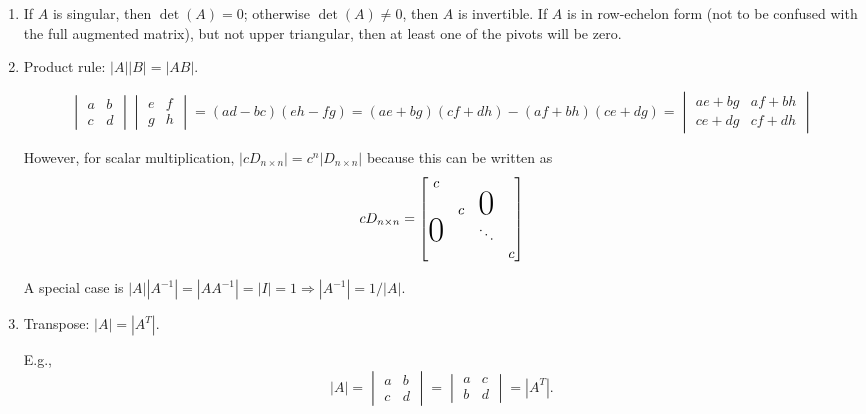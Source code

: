 \documentclass[reqno]{amsart}
\theoremstyle{definition}
\newenvironment{handwave}{%
  \renewcommand{\proofname}{Handwavey proof}\proof}{\endproof}
\begin{document}
\begin{enumerate}
\begin{handwave}
\end{handwave}

\item  If $A$ is singular, then $\det(A) = 0$; otherwise $\det(A) \neq 0$, then $A$ is invertible.
If $A$ is in row-echelon form (not to be confused with the full augmented matrix), but not upper triangular,
then at least one of the pivots will be zero.

\item  Product rule: $|A||B| = |AB|$.

\begin{equation*}
\begin{vmatrix}
a & b\\
c & d
\end{vmatrix}\begin{vmatrix}
e & f\\
g & h
\end{vmatrix} = (ad - bc)(eh - fg) = (ae+bg)(cf+dh) - ( af+bh)(ce+dg) = \begin{vmatrix}
ae+bg & af+bh\\
ce+dg & cf+dh
\end{vmatrix}
\end{equation*}

However, for scalar multiplication, $|cD_{n \times n}| = c^n|D_{n \times n}|$ because this can be written as
%
\begin{equation*}
cD_{n \times n} = \begin{bmatrix}
c &  &  & \\
 & c & \bigzero & \\
\bigzero &  & \ddots & \\
 & & & c
\end{bmatrix}
\end{equation*}

A special case is $|A||A^{-1}| = |AA^{-1}| = |I| = 1 \Rightarrow |A^{-1}| = 1/|A|$.

\item  Transpose:  $|A| = |A^T|$.

E.g.,
%
\begin{equation*}
|A| = \begin{vmatrix}
a & b\\
c & d
\end{vmatrix} = \begin{vmatrix}
a & c\\
b & d
\end{vmatrix} = |A^T|.
\end{equation*}


\end{enumerate}
\end{document}
